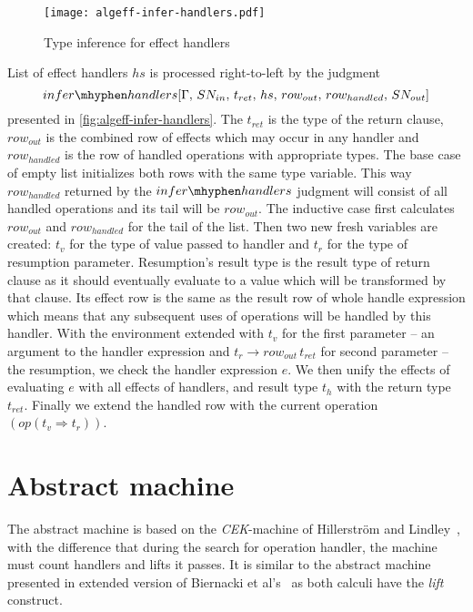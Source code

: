 \documentclass[inz, english, longabstract]{iithesis}
\begin{document}
\begin{figure}
  \centering
  \texttt{[image: algeff-infer-handlers.pdf]}
  \caption{Type inference for effect handlers} 
  \label{fig:algeff-infer-handlers} 
\end{figure} 

List of effect handlers $ hs $ is processed right-to-left by the judgment 
$$ infer\mhyphen handlers [\Gamma , \, SN_{in} , \, t_{ret} , \, hs , \, row_{out} , \, row_{handled} , \, SN_{out}] $$
presented in \autoref{fig:algeff-infer-handlers}.
The $ t_{ret} $ is the type of the return clause, $ row_{out} $ is the combined row of effects which may occur in any handler and $ row_{handled} $ is the row of handled operations with appropriate types.
The base case of empty list initializes both rows with the same type variable.
This way $ row_{handled} $ returned by the $infer\mhyphen handlers$ judgment will consist of all handled operations and its tail will be $ row_{out} $.
The inductive case first calculates $ row_{out} $ and $ row_{handled} $ for the tail of the list.
Then two new fresh variables are created: $ t_v $ for the type of value passed to handler and $ t_r $ for the type of resumption parameter.
Resumption's result type is the result type of return clause as it should eventually evaluate to a value which will be transformed by that clause.
Its effect row is the same as the result row of whole handle expression which means that any subsequent uses of operations will be handled by this handler.
With the environment extended with $ t_v $ for the first parameter -- an argument to the handler expression and $ t_r \rightarrow row_{out} \, t_{ret} $ for second parameter -- the resumption, we check the handler expression $ e $.
We then unify the effects of evaluating $ e $ with all effects of handlers, and result type $ t_{h} $ with the return type $ t_{ret} $.
Finally we extend the handled row with the current operation $(op (t_v \Rightarrow t_r))$.

\section{Abstract machine}
The abstract machine is based on the \emph{CEK}-machine of Hillerström and Lindley~\cite{Hillerstrom2016}, with the difference that during the search for operation handler, the machine must count handlers and lifts it passes.
It is similar to the abstract machine presented in extended version of Biernacki et al's~\cite{Biernacki2017} as both calculi have the \emph{lift} construct.
\end{document}

